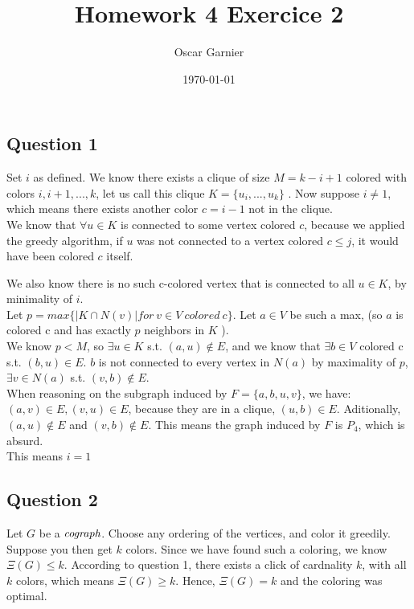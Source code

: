 \documentclass{scrartcl}
\title{Homework 4 Exercice 2}
\author{Oscar Garnier}
\date{\today}
\begin{document}
\newcommand{\E}[1]{\section*{Exo #1}}
\newcommand{\CR}[2]{\section*{#1 // note : #2}}
\newcommand{\Q}[1]{\section*{Exercise #1}}
\newcommand{\SQ}[1]{\subsection*{Question #1}}
\maketitle

\SQ{1}
Set \( i \) as defined. We know there exists a clique of size \( M = k - i + 1 \) colored with colors \( i, i+ 1, ..., k \), let us call this clique \( K = \{ u_i, ..., u_k \} \) . Now suppose \( i \neq 1 \), which means there exists another color \( c = i - 1\) not in the clique. \\

We know that \( \forall u \in K\) is connected to some vertex colored \( c \), because we applied the greedy algorithm, if \( u\) was not connected to a vertex colored \( c \leq j \), it would have been colored \( c \) itself. 

We also know there is no such c-colored vertex that is connected to all \(u \in K \), by minimality of \( i \). \\


Let \( p = max \{ |K \cap N(v)| for \ v \in V \ colored \ c \} \). Let \( a \in V \) be such a max, (so \( a \) is colored c and has exactly \( p \) neighbors in \( K \) ). \\
We know \( p < M \), so \( \exists u \in K \) s.t. \( (a,u) \not \in E \), and we know that \( \exists b \in V \) colored c s.t. \( (b,u) \in E\). \( b\) is not connected to every vertex in \( N(a) \) by maximality of \( p \), \( \exists v \in N(a) \) s.t. \( (v,b) \not \in E \). \\
When reasoning on the subgraph induced by \( F = \{a,b,u,v\} \), we have: \( (a,v) \in E, (v,u) \in E \), because they are in a clique, \( (u,b) \in E \). Aditionally, \( (a,u) \not \in E \) and \( (v,b) \not \in E \). This means the graph induced by \( F \) is \( P_4 \), which is absurd.\\
This means \( i = 1 \)

 
\SQ{2}
Let \( G \) be a \( \emph{cograph} \). Choose any ordering of the vertices, and color it greedily. Suppose you then get \( k \) colors. Since we have found such a coloring, we know \( \Xi(G) \leq k \). According to question 1, there exists a click of cardnality \( k \), with all \( k \) colors, which means \( \Xi(G) \geq k \). Hence, \( \Xi(G) = k \) and the coloring was optimal.
\end{document}
